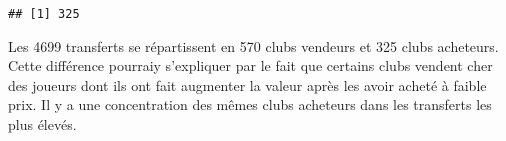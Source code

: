 \documentclass[]{article}
\begin{document}
\begin{verbatim}
## [1] 325
\end{verbatim}

Les 4699 transferts se répartissent en 570 clubs vendeurs et 325 clubs
acheteurs. Cette différence pourraiy s'expliquer par le fait que
certains clubs vendent cher des joueurs dont ils ont fait augmenter la
valeur après les avoir acheté à faible prix. Il y a une concentration
des mêmes clubs acheteurs dans les transferts les plus élevés.
\end{document}
